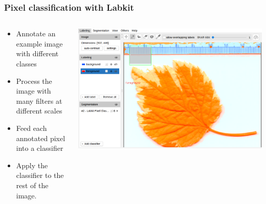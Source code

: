 \documentclass[ignorenonframetext,aspectratio=169,10pt,xcolor=table]{beamer}
\begin{document}
\begin{frame} \frametitle{Pixel classification with Labkit}
  \begin{columns}
    \begin{column}{0.5\textwidth}
      \begin{itemize}
        \item Annotate an example image with different classes
        \item Process the image with many filters at different scales
        \item Feed each annotated pixel into a classifier
        \item Apply the classifier to the rest of the image.
      \end{itemize}
    \end{column}
    \begin{column}{0.5\textwidth}
      \includegraphics[width=\textwidth]{labkit.png}
    \end{column}
  \end{columns}
\end{frame}
\end{document}

